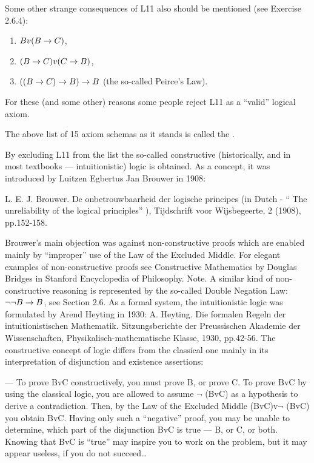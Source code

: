Some other strange consequences of L11 also should be mentioned (see Exercise 2.6.4):

\begin{enumerate}
    \item \(Bv(B\rightarrow C)\),
    \item \((B\rightarrow C)v(C\rightarrow B)\),
    \item \(((B\rightarrow C)\rightarrow B)\rightarrow B\) (the so-called Peirce's Law).
\end{enumerate}

For these (and some other) reasons some people reject L11 as a ``valid'' logical axiom.

The above list of 15 axiom schemas as it stands is called the .

By excluding L11 from the list the so-called constructive (historically, and in most textbooks --- intuitionistic) logic is obtained. As a concept, it was introduced by Luitzen Egbertus Jan Brouwer in 1908:

L. E. J. Brouwer. De onbetrouwbaarheid der logische principes (in Dutch - `` The unreliability of the logical principles'' ), Tijdschrift voor Wijsbegeerte, 2 (1908), pp.152-158.

Brouwer's main objection was against non-constructive proofs which are enabled mainly by ``improper'' use of the Law of the Excluded Middle.  For elegant examples of non-constructive proofs see Constructive Mathematics by Douglas Bridges in Stanford Encyclopedia of Philosophy.  Note. A similar kind of non-constructive reasoning is represented by the so-called Double Negation Law: \(\neg \neg B\rightarrow B\), see Section 2.6.  As a formal system, the intuitionistic logic was formulated by Arend Heyting in 1930: A. Heyting. Die formalen Regeln der intuitionistischen Mathematik. Sitzungsberichte der Preussischen Akademie der Wissenschaften, Physikalisch-mathematische Klasse, 1930, pp.42-56.  The constructive concept of logic differs from the classical one mainly in its interpretation of disjunction and existence assertions:

--- To prove BvC constructively, you must prove B, or prove C. To prove BvC by using the classical logic, you are allowed to assume \(\neg\) (BvC) as a hypothesis to derive a contradiction. Then, by the Law of the Excluded Middle (BvC)v\(\neg\) (BvC) you obtain BvC. Having only such a ``negative'' proof, you may be unable to determine, which part of the disjunction BvC is true --- B, or C, or both. Knowing that BvC is ``true'' may inspire you to work on the problem, but it may appear useless, if you do not succeed\ldots

